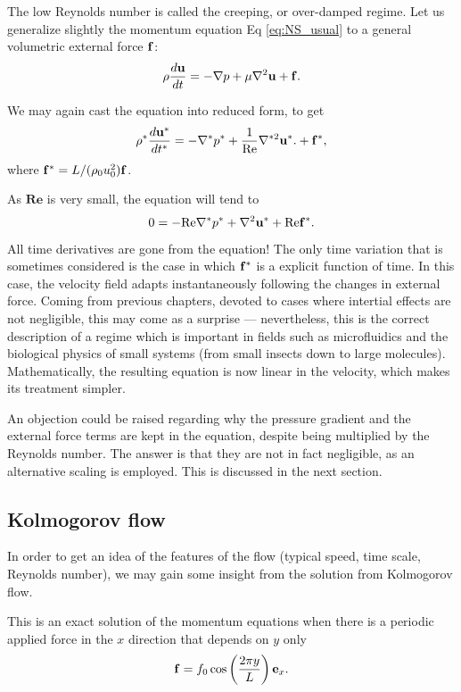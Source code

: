The low Reynolds number is called the creeping, or over-damped
regime. Let us generalize slightly the momentum equation
Eq \ref{eq:NS_usual} to a general volumetric external force $\mathbf{f}$:
\[
  \rho \frac{d\mathbf{u} }{dt} =
  - \nabla p 
  + \mu \nabla^2 \mathbf{u}
  + \mathbf{f} .
\]

We may again cast the equation into reduced form, to get
\[
\rho^* \frac{d\mathbf{u}^* }{dt^* } =
-  \nabla^* p^*
+  \frac1{\mathrm{Re}} \nabla^{*2} \mathbf{u}^* .
+  \mathbf{f}^* ,
\]
where $\mathbf{f}^*= L/(\rho_0 u_0^2) \mathbf{f}$. 

As $\mathbf{Re}$ is very small, the equation will tend to
\[
0 = - \mathrm{Re} \nabla^* p^* + \nabla^2 \mathbf{u}^* + \mathrm{Re} \mathbf{f}^*
.
\]
All time derivatives are gone from the equation! The only time
variation that is sometimes considered is the case in which $\mathbf{f}^*$
is a explicit function of time. In this case, the velocity field
adapts instantaneously following the changes in external force. Coming
from previous chapters, devoted to cases where intertial effects are
not negligible, this may come as a surprise --- nevertheless, this is
the correct description of a regime which is important in fields such
as microfluidics and the biological physics of small systems (from
small insects down to large molecules).  Mathematically, the resulting
equation is now linear in the velocity, which makes its treatment
simpler.

An objection could be raised regarding why the pressure gradient and
the external force terms are kept in the equation, despite being
multiplied by the Reynolds number. The answer is that they are not
in fact negligible, as an alternative scaling is employed. This is
discussed in the next section.



\subsection{Kolmogorov flow}

In order to get an idea of the features of the flow (typical speed,
time scale, Reynolds number), we may gain some insight from the
solution from Kolmogorov flow.

This is an exact solution of the momentum equations when there is a
periodic applied force in the $x$ direction that depends on $y$ only
\[
\mathbf{f} = f_0 \cos\left( \frac{2\pi y}{L} \right) \mathbf{e}_x .
\]

